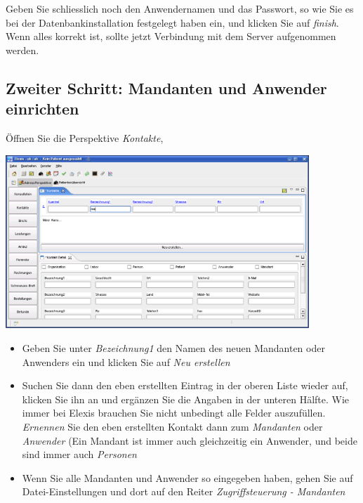 Geben Sie schliesslich noch den Anwendernamen und das Passwort, so wie Sie es bei der Datenbankinstallation festgelegt haben ein, und klicken Sie auf \textit{finish}.
 Wenn alles korrekt ist, sollte jetzt Verbindung mit dem Server aufgenommen werden.

\subsection{Zweiter Schritt: Mandanten und Anwender einrichten}
Öffnen Sie die Perspektive \textit{Kontakte},

\includegraphics[width=4.5in]{images/grundkonfkonta.png}
\begin{itemize}
 \item Geben Sie unter \textit{Bezeichnung1} den Namen des neuen Mandanten oder Anwenders ein und klicken Sie auf \textit{Neu erstellen}
 \item Suchen Sie dann den eben erstellten Eintrag in der oberen Liste wieder auf, klicken Sie ihn an und ergänzen Sie die Angaben in der unteren Hälfte. Wie immer bei Elexis brauchen Sie nicht unbedingt alle Felder auszufüllen. \textit{Ernennen} Sie den eben erstellten Kontakt dann zum \textit{Mandanten} oder \textit{Anwender} (Ein Mandant ist immer auch gleichzeitig ein Anwender, und beide sind immer auch \textit{Personen}
 \item Wenn Sie alle Mandanten und Anwender so eingegeben haben, gehen Sie auf Datei-Einstellungen und dort auf den Reiter \textit{Zugriffsteuerung - Mandanten}
\end{itemize}

